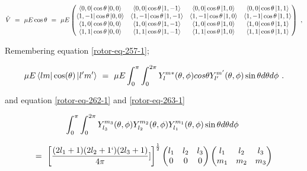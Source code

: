 \documentclass{article}
\begin{document}
\begin{equation} \label{rotor-eq-269-1}
\hat{V} \hspace{0.125cm} = \hspace{0.125cm} \mu E \cos\theta \hspace{0.125cm} = \hspace{0.125cm} \mu E \begin{pmatrix} \bra{0,0}\cos\theta\ket{0,0} & \bra{0,0}\cos\theta\ket{1,-1} & \bra{0,0}\cos\theta\ket{1,0} & \bra{0,0}\cos\theta\ket{1,1} \\ \bra{1,-1}\cos\theta\ket{0,0} & \bra{1,-1}\cos\theta\ket{1,-1} & \bra{1,-1}\cos\theta\ket{1,0} & \bra{1,-1}\cos\theta\ket{1,1} \\ \bra{1,0}\cos\theta\ket{0,0} & \bra{1,0}\cos\theta\ket{1,-1} & \bra{1,0}\cos\theta\ket{1,0} & \bra{1,0}\cos\theta\ket{1,1} \\ \bra{1,1}\cos\theta\ket{0,0} & \bra{1,1}\cos\theta\ket{1,-1} & \bra{1,1}\cos\theta\ket{1,0} & \bra{1,1}\cos\theta\ket{1,1}
\end{pmatrix} \hspace{0.125cm} ,
\end{equation} 

Remembering equation \ref{rotor-eq-257-1};

\begin{equation} \label{rotor-eq-270-1}
\mu E\bra{l m}\cos(\theta)\ket{l' m'} \hspace{0.125cm} = \hspace{0.125cm} \mu E \int_{0}^{\pi} \int_{0}^{2\pi} Y_{l}^{m \ast}(\theta, \phi) cos\theta Y_{l'}^{m'}(\theta, \phi) \sin\theta d\theta d\phi \hspace{0.125cm} . 
\end{equation}

and equation \ref{rotor-eq-262-1} and \ref{rotor-eq-263-1}

\begin{equation} \label{rotor-eq-271-1}
\int_{0}^{\pi} \int_{0}^{2\pi} Y_{l_{3}}^{m_{3}}(\theta, \phi) Y_{l_{2}}^{m_{2}}(\theta, \phi) Y_{l_{1}}^{m_{1}}(\theta, \phi) \sin\theta d\theta d\phi \hspace{0.125cm} 
\end{equation}

\begin{equation} \label{rotor-eq-272-1}
= \hspace{0.125cm} \bigg[\frac{(2 l_1 + 1)(2 l_2 + 1`)(2 l_3 + 1)}{4\pi}]\bigg]^{\frac{1}{2}}\begin{pmatrix} l_1 & l_2 & l_3 \\ 0 & 0 & 0 \end{pmatrix}\begin{pmatrix} l_1 & l_2 & l_3 \\ m_1 & m_2 & m_3 \end{pmatrix}
\end{equation}
\end{document}
